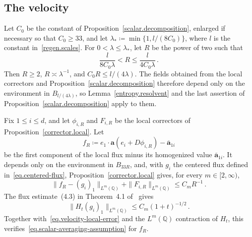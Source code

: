 \documentclass[11pt]{amsart}
\theoremstyle{definition}
\theoremstyle{remark}
\numberwithin{equation}{section}
\newcommand{\Q}{\mathbb Q}
\renewcommand{\a}{\mathbf a}
\newcommand{\ahom}{\overline{\mathbf a}}
\begin{document}
\subsection{The velocity}\label{ss.velocity}

Let $C_0$ be the constant of Proposition~\ref{scalar.decomposition}, enlarged if necessary so that $C_0\geq33$, and let $\lambda_*\coloneqq\min\{1,l/(8C_0)\}$, where $l$ is the constant in~\eqref{regen.scales}. For $0<\lambda\leq\lambda_*$, let $R$ be the power of two such that
\begin{equation}\label{eq.localization-scale}
 \frac{l}{8C_0\lambda}<R\leq\frac{l}{4C_0\lambda}\, .
\end{equation}
Then $R\geq2$, $R\asymp\lambda^{-1}$, and $C_0R\leq l/(4\lambda)$. The fields obtained from the local correctors and Proposition~\ref{scalar.decomposition} therefore depend only on the environment in $B_{l/(4\lambda)}$, so Lemma~\ref{entropy.resolvent} and the last assertion of Proposition~\ref{scalar.decomposition} apply to them.

Fix $1\leq i\leq d$, and let $\phi_{i,R}$ and $F_{i,R}$ be the local correctors of Proposition~\ref{corrector.local}. Let
\begin{equation}\label{eq.velocity-local-flux}
 f_R\coloneqq e_1\cdot\a(e_i+D\phi_{i,R})-\ahom_{1i}
\end{equation}
be the first component of the local flux minus its homogenized value $\ahom_{1i}$. It depends only on the environment in $B_{33R}$, and, with $g_i$ the centered flux defined in~\eqref{eq.centered-flux}, Proposition~\ref{corrector.local} gives, for every $m\in[2,\infty)$,
\begin{equation}\label{eq.velocity-local-error}
 \|f_R-(g_i)_1\|_{L^m(\Q)}+\|F_{i,R}\|_{L^m(\Q)}\leq C_mR^{-1}\, .
\end{equation}
The flux estimate~(4.3) in Theorem~4.1 of~\citet{AKM2019book} gives
\begin{equation*}
 \|H_t(g_i)_1\|_{L^m(\Q)}\leq C_m(1+t)^{-1/2}\, .
\end{equation*}
Together with~\eqref{eq.velocity-local-error} and the $L^m(\Q)$ contraction of $H_t$, this verifies~\eqref{eq.scalar-averaging-assumption} for $f_R$.
\end{document}
